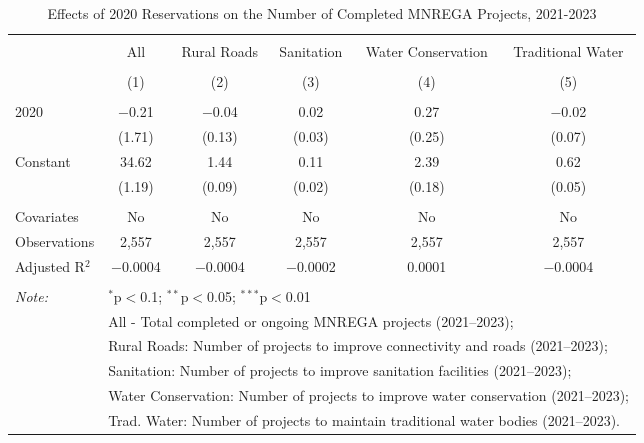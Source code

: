 
\begin{table}[!htbp] \centering 
  \caption{Effects of 2020 Reservations on the Number of Completed MNREGA Projects, 2021-2023} 
  \label{main_mnrega_20} 
\scriptsize 
\begin{tabular}{@{\extracolsep{0pt}}lccccc} 
\\[-1.8ex]\hline 
\hline \\[-1.8ex] 
 & All & Rural Roads & Sanitation & Water Conservation & Traditional Water \\ 
\\[-1.8ex] & (1) & (2) & (3) & (4) & (5)\\ 
\hline \\[-1.8ex] 
 2020 & $-$0.21 & $-$0.04 & 0.02 & 0.27 & $-$0.02 \\ 
  & (1.71) & (0.13) & (0.03) & (0.25) & (0.07) \\ 
  Constant & 34.62 & 1.44 & 0.11 & 2.39 & 0.62 \\ 
  & (1.19) & (0.09) & (0.02) & (0.18) & (0.05) \\ 
 \hline \\[-1.8ex] 
Covariates & No & No & No & No & No \\ 
Observations & 2,557 & 2,557 & 2,557 & 2,557 & 2,557 \\ 
Adjusted R$^{2}$ & $-$0.0004 & $-$0.0004 & $-$0.0002 & 0.0001 & $-$0.0004 \\ 
\hline 
\hline \\[-1.8ex] 
\textit{Note:}  & \multicolumn{5}{l}{$^{*}$p$<$0.1; $^{**}$p$<$0.05; $^{***}$p$<$0.01} \\ 
 & \multicolumn{5}{l}{All - Total completed or ongoing MNREGA projects (2021--2023);} \\ 
 & \multicolumn{5}{l}{Rural Roads: Number of projects to improve connectivity and roads (2021--2023);} \\ 
 & \multicolumn{5}{l}{Sanitation:  Number of projects to improve sanitation facilities  (2021--2023);} \\ 
 & \multicolumn{5}{l}{Water Conservation: Number of projects to improve water conservation (2021--2023);} \\ 
 & \multicolumn{5}{l}{Trad. Water: Number of projects to maintain traditional water bodies (2021--2023).} \\ 
\end{tabular} 
\end{table} 
